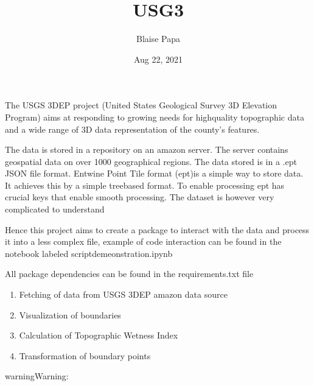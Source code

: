 \documentclass[letterpaper,10pt,english]{sphinxmanual}
\title{USG3}
\date{Aug 22, 2021}
\author{Blaise Papa}
\begin{document}
\pagestyle{empty}
\sphinxmaketitle
\pagestyle{plain}
\sphinxtableofcontents
\pagestyle{normal}
\label{\detokenize{index::doc}}


\sphinxAtStartPar
The USGS 3DEP project (United States Geological Survey 3D Elevation Program) aims at responding to growing needs for high\sphinxhyphen{}quality topographic data and a wide range of 3D data representation of the county’s features.

\sphinxAtStartPar
The data is stored in a repository on an amazon server. The server contains geospatial data on over 1000 geographical regions. The data stored is in a .ept JSON file format. Entwine Point Tile format (ept)is a simple way to store data. It achieves this by a simple tree\sphinxhyphen{}based format. To enable processing ept has crucial keys that enable smooth processing. The dataset is however very complicated to understand

\sphinxAtStartPar
Hence this project aims to create a package to interact with the data and process it into a less complex file, example of code interaction can be found in the notebook labeled scriptdemeonstration.ipynb

\sphinxAtStartPar
All package dependencies can be found in the requirements.txt file

\sphinxAtStartPar
{}
\begin{enumerate}
%
\item {} 
\sphinxAtStartPar
Fetching of data from USGS 3DEP amazon data source

\item {} 
\sphinxAtStartPar
Visualization of boundaries

\item {} 
\sphinxAtStartPar
Calculation of Topographic Wetness Index

\item {} 
\sphinxAtStartPar
Transformation of boundary points

\end{enumerate}

\begin{sphinxadmonition}{warning}{Warning:}
\sphinxAtStartPar
{}
\end{sphinxadmonition}
\end{document}
